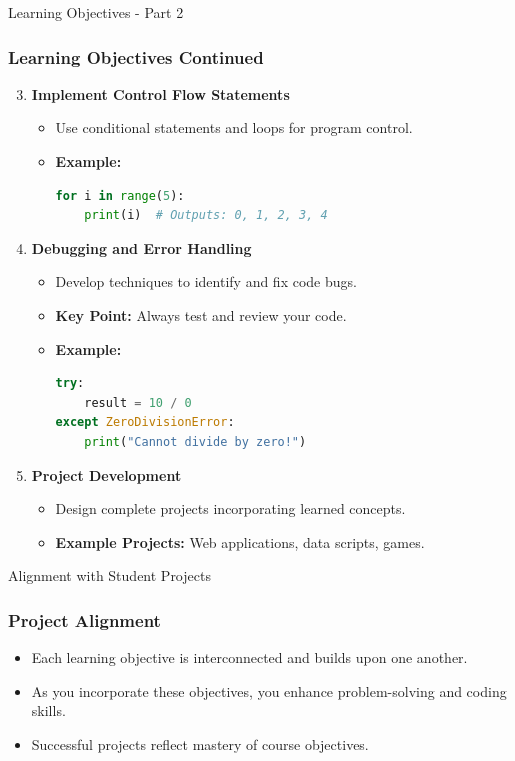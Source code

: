 \documentclass{beamer}
\begin{document}
\begin{frame}{Learning Objectives - Part 2}
    \frametitle{Learning Objectives Continued}
    \begin{enumerate}
        \setcounter{enumi}{2}
        \item \textbf{Implement Control Flow Statements}
            \begin{itemize}
                \item Use conditional statements and loops for program control.
                \item \textbf{Example:}
                \begin{lstlisting}[language=Python]
for i in range(5):
    print(i)  # Outputs: 0, 1, 2, 3, 4
                \end{lstlisting}
            \end{itemize}
        \item \textbf{Debugging and Error Handling}
            \begin{itemize}
                \item Develop techniques to identify and fix code bugs.
                \item \textbf{Key Point:} Always test and review your code.
                \item \textbf{Example:}
                \begin{lstlisting}[language=Python]
try:
    result = 10 / 0
except ZeroDivisionError:
    print("Cannot divide by zero!")
                \end{lstlisting}
            \end{itemize}
        \item \textbf{Project Development}
            \begin{itemize}
                \item Design complete projects incorporating learned concepts.
                \item \textbf{Example Projects:} Web applications, data scripts, games.
            \end{itemize}
    \end{enumerate}
\end{frame}

\begin{frame}{Alignment with Student Projects}
    \frametitle{Project Alignment}
    \begin{itemize}
        \item Each learning objective is interconnected and builds upon one another.
        \item As you incorporate these objectives, you enhance problem-solving and coding skills.
        \item Successful projects reflect mastery of course objectives.
    \end{itemize}
\end{frame}
\end{document}
